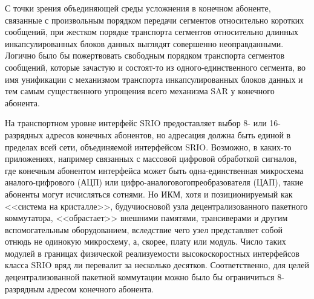 \begin{multicols}{2}
С точки зрения объединяющей среды 
усложнения в конечном абоненте, связанные с произвольным порядком передачи сегментов 
относительно коротких сообщений, при жестком порядке транспорта сегментов 
относительно длинных инкапсулированных блоков данных выглядят совершенно 
неоправданными. Логично было бы пожертвовать свободным порядком транспорта 
сегментов сообщений, которые зачастую и состоят-то из одного-единственного сегмента, во 
имя унификации с механизмом транспорта инкапсулированных блоков данных и тем самым 
существенного упрощения всего механизма SAR у конечного абонента.
     
     На транспортном уровне интерфейс SRIO предо\-став\-ля\-ет выбор 8- или 16-разрядных 
адресов\linebreak
конечных абонентов, но адресация должна быть единой в пределах всей сети, 
объединяемой интерфейсом SRIO. Возможно, в каких-то приложениях, например связанных 
с массовой цифровой обработкой сигналов, где конечным абонентом интерфейса может 
быть одна-единственная микросхема
 аналого-цифрового (АЦП) или цифро-аналогового\linebreak преобразователя (ЦАП), 
такие абоненты могут исчисляться 
сотнями. Но ИКМ, хотя и позиционируемый как <<система на кристалле>>, будучи\linebreak  основой 
узла децентрализованного пакетного коммутатора, <<обрастает>> внешними памятями, 
транси\-ве\-ра\-ми и другим вспомогательным оборудованием, вследствие чего узел представляет 
собой отнюдь не одинокую мик\-ро\-схе\-му, а, скорее, плату или модуль. Число таких модулей в 
границах физической реализуемости высокоскоростных интерфейсов класса SRIO вряд ли 
перевалит за несколько десятков. Соответственно, для целей децентрализованной пакетной 
коммутации можно было бы ограничиться 8-разрядным адресом конечного абонента.

\begin{figure*} %
\vspace*{1pt}
\begin{center}
\vspace*{1pt}
\mbox{%
\epsfxsize=130.163mm
}
\end{center}
\vspace*{-9pt}
\end{figure*}
     

\end{multicols}
